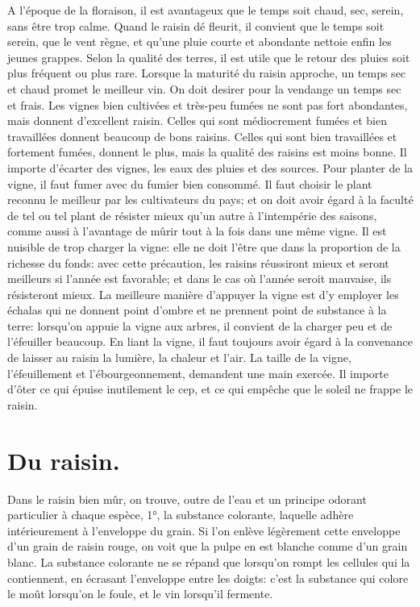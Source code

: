 A l'époque de la floraison, il est avantageux que le temps soit chaud, sec, serein, sans être trop calme.
Quand le raisin dé fleurit, il convient que le temps soit serein, que le vent règne, et qu'une pluie courte et abondante nettoie enfin les jeunes grappes. Selon la qualité des terres, il est utile que le retour des pluies soit plus fréquent ou plus rare. Lorsque la maturité du raisin approche, un temps sec et chaud promet le meilleur vin. On doit desirer pour la vendange un temps sec et frais.
Les vignes bien cultivées et très-peu fumées ne sont pas fort abondantes, mais donnent d'excellent raisin. Celles qui sont médiocrement fumées et bien travaillées donnent beaucoup de bons raisins. Celles qui sont bien travaillées et fortement fumées, donnent le plus, mais la qualité des raisins est moins bonne. Il importe d'écarter des\setcounter{page}{80} vignes, les eaux des pluies et des sources.
Pour planter de la vigne, il faut fumer avec du fumier bien consommé. Il faut choisir le plant reconnu le meilleur par les cultivateurs du pays; et on doit avoir égard à la faculté de tel ou tel plant de résister mieux qu'un autre à l'intempérie des saisons, comme aussi à l'avantage de mûrir tout à la fois dans une même vigne.
Il est nuisible de trop charger la vigne: elle ne doit l'être que dans la proportion de la richesse du fonds: avec cette précaution, les raisins réussiront mieux et seront meilleurs si l'année est favorable; et dans le cas où l'année seroit mauvaise, ils résisteront mieux.
La meilleure manière d'appuyer la vigne est d'y employer les échalas qui ne donnent point d'ombre et ne prennent point de substance à la terre: lorsqu'on appuie la vigne aux arbres, il convient de la charger peu et de l'éfeuiller beaucoup.
En liant la vigne, il faut toujours avoir égard à la convenance de laisser au raisin la lumière, la chaleur et l'air.
La taille de la vigne, l'éfeuillement et l'ébourgeonnement, demandent une main exercée. Il importe d'ôter ce qui épuise inutilement le cep, et ce qui empêche que le soleil ne frappe le raisin.\setcounter{page}{81} \section{Du raisin.}
Dans le raisin bien mûr, on trouve, outre de l'eau et un principe odorant particulier à chaque espèce, 1°, la substance colorante, laquelle adhère intérieurement à l'enveloppe du grain. Si l'on enlève légèrement cette enveloppe d'un grain de raisin rouge, on voit que la pulpe en est blanche comme d'un grain blanc. La substance colorante ne se répand que lorsqu'on rompt les cellules qui la contiennent, en écrasant l'enveloppe entre les doigts: c'est la substance qui colore le moût lorsqu'on le foule, et le vin lorsqu'il fermente.
